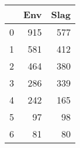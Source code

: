 \begin{tabular}{lrr}
\toprule
{} &  Env &  Slag \\
\midrule
0 &  915 &   577 \\
1 &  581 &   412 \\
2 &  464 &   380 \\
3 &  286 &   339 \\
4 &  242 &   165 \\
5 &   97 &    98 \\
6 &   81 &    80 \\
\bottomrule
\end{tabular}
